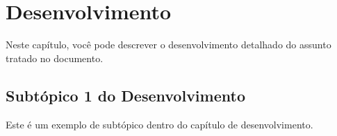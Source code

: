 \chapter{Desenvolvimento}
Neste capítulo, você pode descrever o desenvolvimento detalhado do assunto tratado no documento.

\section{Subtópico 1 do Desenvolvimento}
Este é um exemplo de subtópico dentro do capítulo de desenvolvimento.

\clearpage
